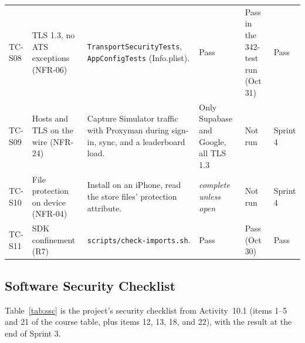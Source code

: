 \documentclass[12pt,letterpaper]{article}
\begin{document}
\begin{xltabular}{\textwidth}{@{}L{1.2cm} L{2.4cm} Y L{2.4cm} L{2.4cm} L{1.5cm}@{}}
TC-S08 & TLS 1.3, no ATS exceptions (NFR-06) & \texttt{TransportSecurityTests}, \texttt{AppConfigTests} (Info.plist). & Pass & Pass in the 342-test run (Oct 31) & Pass \\
TC-S09 & Hosts and TLS on the wire (NFR-24) & Capture Simulator traffic with Proxyman during sign-in, sync, and a leaderboard load. & Only Supabase and Google, all TLS 1.3 & Not run & Sprint 4 \\
TC-S10 & File protection on device (NFR-04) & Install on an iPhone, read the store files' protection attribute. & \emph{complete unless open} & Not run & Sprint 4 \\
TC-S11 & SDK confinement (R7) & \texttt{scripts/check-imports.sh}. & Pass & Pass (Oct 30) & Pass \\
\end{xltabular}

\subsection{Software Security Checklist}
Table~\ref{tab:ssc} is the project's security checklist from Activity~10.1 (items 1--5
and 21 of the course table, plus items 12, 13, 18, and 22), with the result at the end
of Sprint 3.
\end{document}
